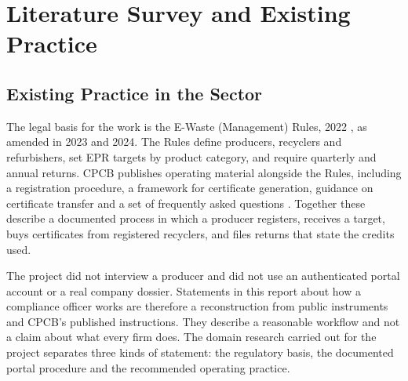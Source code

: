 \chapter{Literature Survey and Existing Practice}
\label{ch:lit}

\section{Existing Practice in the Sector}
\label{sec:practice}
The legal basis for the work is the E-Waste (Management) Rules, 2022 \cite{ewaste2022}, as amended in
2023 and 2024. The Rules define producers, recyclers and refurbishers, set EPR targets by product
category, and require quarterly and annual returns. CPCB publishes operating material alongside the Rules,
including a registration procedure, a framework for certificate generation, guidance on certificate
transfer and a set of frequently asked questions \cite{cpcbfaq2024}. Together these describe a documented
process in which a producer registers, receives a target, buys certificates from registered recyclers, and
files returns that state the credits used.

The project did not interview a producer and did not use an authenticated portal account or a real
company dossier. Statements in this report about how a compliance officer works are therefore a
reconstruction from public instruments and CPCB's published instructions. They describe a reasonable
workflow and not a claim about what every firm does. The domain research carried out for the project
separates three kinds of statement: the regulatory basis, the documented portal procedure and the
recommended operating practice.

